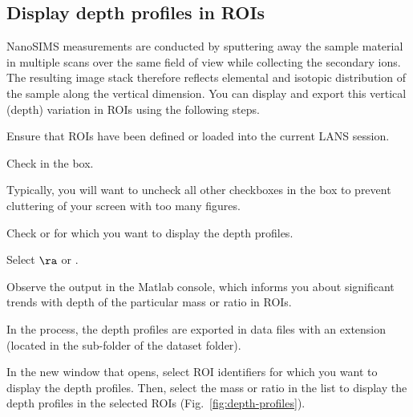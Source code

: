 \subsection{Display depth profiles in ROIs}
\setcounter{step}{0}

\goldbox{}
NanoSIMS measurements are conducted by sputtering away the sample material in multiple scans over the same field of view while collecting the secondary ions. The resulting image stack therefore reflects elemental and isotopic distribution of the sample along the vertical dimension. You can display and export this vertical (depth) variation in ROIs using the following steps.
\tcbe

\s Ensure that ROIs have been defined or loaded into the current LANS session.

\s Check  in the  box.

\nb
\bul Typically, you will want to uncheck all other checkboxes in the  box to prevent cluttering of your screen with too many figures.

\s Check  or  for which you want to display the depth profiles.

\s Select  $\ra$  or .

\nb
\bul Observe the output in the Matlab console, which informs you about significant trends with depth of the particular mass or ratio in ROIs.

\bul In the process, the depth profiles are exported in data files with an extension  (located in the  sub-folder of the dataset folder).

\s In the new window that opens, select ROI identifiers for which you want to display the depth profiles. Then, select the mass or ratio in the list to display the depth profiles in the selected ROIs (Fig.~\ref{fig:depth-profiles}).

